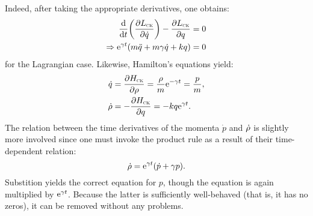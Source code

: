 Indeed, after taking the appropriate derivatives, one obtains:
\begin{equation*} 
    \begin{split}
        \dv{}{t}\qty(\pdv{\ensuremath{L_\text{\tiny{\textsc{CK}}}}}{\dot{q}}) - \pdv{\ensuremath{L_\text{\tiny{\textsc{CK}}}}}{q} &= 0 \\
        \Rightarrow \mathrm{e}^{\gamma t}\qty(m\ddot{q} + m\gamma\dot{q} + kq) &= 0
    \end{split}
\end{equation*}
for the Lagrangian case. Likewise, Hamilton's equations yield: \cite{Tokieda2021}
\begin{equation*}
    \begin{split}
        \dot{q} &= \pdv{\ensuremath{H_\text{\tiny{\textsc{CK}}}}}{\ensuremath{\rho}} = \frac{\rho}{m}\mathrm{e}^{-\gamma t} =  \frac{p}{m}, \\
        \dot{\rho} &= -\pdv{\ensuremath{H_\text{\tiny{\textsc{CK}}}}}{q} = -kq\mathrm{e}^{\gamma t}.\\
    \end{split}
\end{equation*}
The relation between the time derivatives of the momenta $\dot{p}$ and $\dot{\rho}$ is slightly more involved since one must invoke the product rule as a result of their time-dependent relation:
    $$ \dot{\rho} = \mathrm{e}^{\gamma t}\qty(\dot{p} + \gamma p). $$
Substition yields the correct equation for $p$, though the equation is again multiplied by $\mathrm{e}^{\gamma t}$. Because the latter is sufficiently well-behaved (that is, it has no zeros), it can be removed without any problems.

